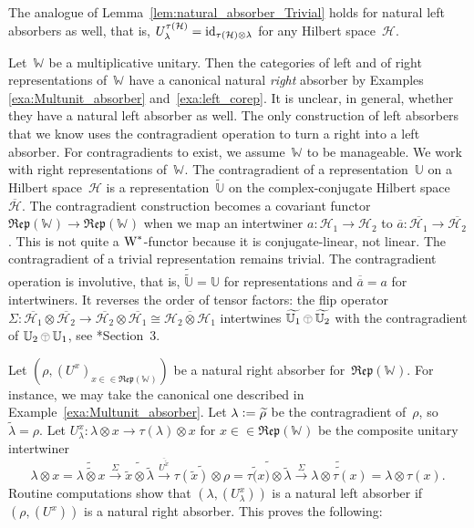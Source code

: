 \documentclass[a4paper]{amsart}
\numberwithin{equation}{section}
\theoremstyle{plain}
\numberwithin{theorem}{section}
\theoremstyle{definition}
\theoremstyle{remark}
\newcommand{\tenscorep}{\mathbin{\begin{tikzpicture}[baseline,x=.75ex,y=.75ex] \draw[line width=.2pt] (-0.8,1.15)--(0.8,1.15);\draw[line width=.2pt](0,-0.25)--(0,1.15); \draw[line width=.2pt] (0,0.75) circle [radius = 1];\end{tikzpicture}}}
\newcommand*{\Corep}[1]{\mathbb{#1}}          %
\newcommand*{\inOb}{\mathrel{\in\in}}%
\newcommand*{\Corepcat}[1]{\mathfrak{Rep}(#1)}%
\newcommand*{\Trivial}{\tau}%
\newcommand*{\nb}{\nobreakdash}
\newcommand*{\Id}{\textup{id}}%
\newcommand*{\Multunit}[1][]{\mathbb W^{#1}}%
\newcommand*{\Wst}{\textup W^*}%
\newcommand*{\Hils}[1][H]{\mathcal{#1}}%
\newcommand*{\defeq}{\mathrel{\vcentcolon=}}
\newcommand*{\conj}[1]{\overline{#1}}
\begin{document}
The analogue of Lemma~\ref{lem:natural_absorber_Trivial} holds for
natural left absorbers as well, that is,
\(U_\lambda^{\Trivial(\Hils)}= \Id_{\Trivial(\Hils) \otimes\lambda}\)
for any Hilbert space~\(\Hils\).

Let~\(\Multunit\) be a multiplicative unitary.  Then the categories
of left and of right representations of~\(\Multunit\) have a
canonical natural \emph{right} absorber by Examples
\ref{exa:Multunit_absorber} and~\ref{exa:left_corep}.  It is
unclear, in general, whether they have a natural left absorber as
well.  The only construction of left absorbers that we know uses the
contragradient operation to turn a right into a left absorber.  For
contragradients to exist, we assume~\(\Multunit\) to be manageable.
We work with right representations of~\(\Multunit\).  The
contragradient of a representation~\(\Corep{U}\) on
a Hilbert space~\(\Hils\) is a
representation~\(\widetilde{\Corep{U}}\) on the complex-conjugate
Hilbert space~\(\conj{\Hils}\).  The contragradient construction
becomes a covariant functor \(\Corepcat{\Multunit} \to
\Corepcat{\Multunit}\) when we map an intertwiner \(a\colon
\Hils_1\to\Hils_2\) to \(\conj{a}\colon \conj{\Hils_1} \to
\conj{\Hils_2}\).  This is not quite a \(\Wst\)\nb-functor because it
is conjugate-linear, not linear.  The
contragradient of a trivial representation remains trivial.  The
contragradient operation is involutive, that is,
\(\widetilde{\widetilde{\Corep{U}}} = \Corep{U}\) for
representations and \(\conj{\conj{a}} = a\) for
intertwiners.  It reverses the order of tensor factors: the flip
operator \(\Sigma\colon \conj{\Hils_1} \otimes \conj{\Hils_2} \to
\conj{\Hils_2} \otimes \conj{\Hils_1} \cong
\conj{\Hils_2\otimes\Hils_1}\) intertwines \(\widetilde{\Corep{U}_1}
\tenscorep \widetilde{\Corep{U}_2}\) with the contragradient of
\(\Corep{U}_2 \tenscorep \Corep{U}_1\), see
\cite{Soltan-Woronowicz:Multiplicative_unitaries}*{Section~3}.

Let \((\rho,(U^x)_{x\inOb\Corepcat{\Multunit}})\) be a natural right
absorber for~\(\Corepcat{\Multunit}\).  For instance, we may take
the canonical one described in Example~\ref{exa:Multunit_absorber}.
Let \(\lambda \defeq \widetilde\rho\) be the contragradient
of~\(\rho\), so \(\widetilde\lambda=\rho\).  Let \(U_\lambda^x\colon
\lambda \otimes x \to \Trivial(\lambda)\otimes x\) for
\(x\inOb\Corepcat{\Multunit}\) be the composite unitary intertwiner
\[
\lambda \otimes x =
\widetilde{\widetilde{\lambda \otimes x}} \xrightarrow{\Sigma}
\widetilde{\tilde{x} \otimes \tilde{\lambda}}
\xrightarrow{\conj{U^{\tilde{x}}}}
\widetilde{\Trivial(\tilde{x}) \otimes \rho}
=
\widetilde{\widetilde{\Trivial(x}) \otimes \widetilde{\lambda}}
 \xrightarrow{\Sigma}
\widetilde{\widetilde{\lambda \otimes \Trivial(x)}}
=
\lambda \otimes \Trivial(x).
\]
Routine computations show that \((\lambda,(U_\lambda^x))\) is a
natural left absorber if \((\rho,(U^x))\) is a natural right
absorber.  This proves the following:
\end{document}

